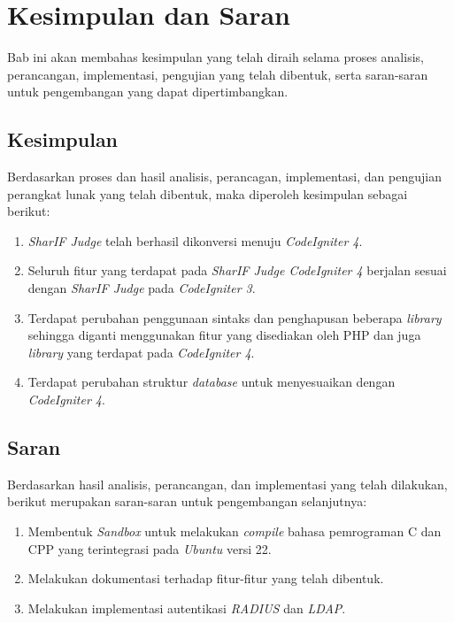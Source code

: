 \chapter{Kesimpulan dan Saran}
\label{chap:kesimpulandansaran}
Bab ini akan membahas kesimpulan yang telah diraih selama proses analisis, perancangan, implementasi, pengujian yang telah dibentuk, serta saran-saran untuk pengembangan yang dapat dipertimbangkan.
\section{Kesimpulan}
Berdasarkan proses dan hasil analisis, perancagan, implementasi, dan pengujian perangkat lunak yang telah dibentuk, maka diperoleh kesimpulan sebagai berikut:
\begin{enumerate}
	\item \textit{SharIF Judge} telah berhasil dikonversi menuju \textit{CodeIgniter 4}. 
	\item Seluruh fitur yang terdapat pada \textit{SharIF Judge CodeIgniter 4} berjalan sesuai dengan \textit{SharIF Judge} pada \textit{CodeIgniter 3}.
	\item Terdapat perubahan penggunaan sintaks dan penghapusan beberapa \textit{library} sehingga diganti menggunakan fitur yang disediakan oleh PHP dan juga \textit{library} yang terdapat pada \textit{CodeIgniter 4}.
	\item Terdapat perubahan struktur \textit{database} untuk menyesuaikan dengan \textit{CodeIgniter 4}.
\end{enumerate}

\section{Saran}
Berdasarkan hasil analisis, perancangan, dan implementasi yang telah dilakukan, berikut merupakan saran-saran untuk pengembangan selanjutnya:
\begin{enumerate}
	\item Membentuk \textit{Sandbox} untuk melakukan \textit{compile} bahasa pemrograman C dan CPP yang terintegrasi pada \textit{Ubuntu} versi 22.
	\item Melakukan dokumentasi terhadap fitur-fitur yang telah dibentuk.
	\item Melakukan implementasi autentikasi \textit{RADIUS} dan \textit{LDAP}.
\end{enumerate}
